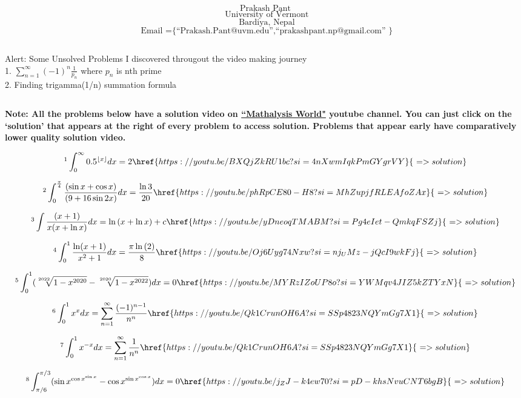 \documentclass[12pt]{article}
\begin{document}
\[ \text{Prakash Pant} \]
\[ \text{ University of Vermont} \]
\[ \text{ Bardiya, Nepal} \]
\[ \text{ Email =\{ ``Prakash.Pant@uvm.edu'',``prakashpant.np@gmail.com'' \} }  \]

\[ \]

Alert:  Some Unsolved Problems I discovered througout the video making journey \\
1. 
$\sum_{n=1}^{\infty} (-1)^n \frac{1}{p_n}$ where $p_n$ is nth prime    \\ 2. Finding trigamma(1/n) summation formula

\[ \]


\textbf{Note: All the problems below have a solution video on \href{https://www.youtube.com/@mathalysisworld}{``Mathalysis World"} youtube channel. You can just click on the `solution' that appears at the right of every problem to access solution. Problems that appear early have comparatively lower quality solution video.}

\[ \footnote{A surprisingly easy Geometric Integral}  \int_0^\infty 0.5^{\lfloor x \rfloor}  dx  = 2   \href{https://youtu.be/BXQjZkRU1bc?si=4nXwmIqkPmGYgrVY}{\,\,=>solution} \]

\[ \footnote{King comes to your help} \int_0^\frac{\pi}{4}	\frac{(\sin{x}+\cos{x})}{(9+16\sin{2x})} dx 	= \frac{\ln{3}}{20} \href{https://youtu.be/phRpCE80-H8?si=MhZupjfRLEAfoZAx}{\,\,=>solution}
\] 

\[\footnote{Is MIT integration Bee this easy?}  \int	\frac{(x+1)}{x(x+\ln{x})} dx  = \ln{(x+\ln{x})}+c			\href{https://youtu.be/yDneoqTMABM?si=Pg4eIet-QmkqFSZj}{\,\,=>solution}					
\] 

\[\footnote{The Mysterious Integral}  \int_0^1	\frac{\ln(x+1)}{x^2+1} dx 	= \frac{\pi\ln{(2)}}{8}	\href{https://youtu.be/Oj6Uyg74Nxw?si=nj_UMz-jQcI9wkFj}{\,\,=>solution} 							
\] 

\[\footnote{The Quarrelsome Integral} \int_0^1	(\sqrt[2022]{1-x^{2020}} - \sqrt[2020]{1-x^{2022}} )  dx  =0 								 
\href{https://youtu.be/MYRzIZoUP8o?si=YWMqv4JIZ5kZTYxN}{\,\,=>solution}   \] 

\[\footnote{Sophomore's Dream-i} \int_0^1 x^x dx = \sum_{n=1}^{\infty} \frac{(-1)^{n-1}}{n^n} 
\href{https://youtu.be/Qk1CrunOH6A?si=SSp4823NQYmGg7X1}{\,\,=>solution}   \]

\[\footnote{Sophomore's Dream-ii} \int_0^1 x^{-x} dx = \sum_{n=1}^{\infty} \frac{1}{n^n} 
\href{https://youtu.be/Qk1CrunOH6A?si=SSp4823NQYmGg7X1}{\,\,=>solution}  \]

\[\footnote{The trigonometric towers integral }   \int_{\pi/6}^{\pi/3} ({\sin{x}^{\cos{x}^{\sin{x}}}} - {\cos{x}^{\sin{x}^{\cos{x}}}}) dx  = 0  \href{https://youtu.be/j_ZJ-k4ew70?si=pD-khsNvuCNT6bgB}{\,\,=>solution}  \]
\end{document}
